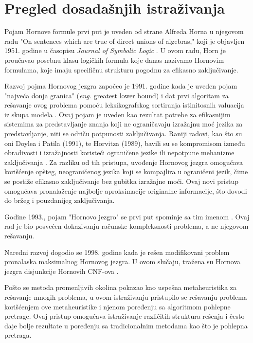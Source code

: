 \documentclass[12pt,oneside]{memoir}
\begin{document}
\section{Pregled dosadašnjih istraživanja}

Pojam Hornove formule prvi put je uveden od strane Alfreda Horna u njegovom radu "On sentences which are true of direct unions of algebras," koji je objavljen 1951. godine u časopisu \textit{Journal of Symbolic Logic} \cite{doc_horn_clause}. U ovom radu, Horn je proučavao posebnu klasu logičkih formula koje danas nazivamo Hornovim formulama, koje imaju specifičnu strukturu pogodnu za efikasno zaključivanje.

Razvoj pojma Hornovog jezgra započeo je 1991. godine kada je uveden pojam "najveća donja granica" (\textit{eng.} greatest lower bound) i dat prvi algoritam za rešavanje ovog problema pomoću leksikografskog sortiranja istinitosnih valuacija iz skupa modela \cite{doc2}. Ovaj pojam je uveden kao rezultat potrebe za efikasnijim sistemima za predstavljanje znanja koji ne ograničavaju izražajnu moć jezika za predstavljanje, niti se odriču potpunosti zaključivanja. Raniji radovi, kao što su oni Doylea i Patila (1991), te Horvitza (1989), bavili su se kompromisom između obradivosti i izražajnosti koristeći ograničene jezike ili nepotpune mehanizme zaključivanja \cite{doyle1991, horvitz1989}. Za razliku od tih pristupa, uvođenje Hornovog jezgra omogućava korišćenje opšteg, neograničenog jezika koji se kompajlira u ograničeni jezik, čime se postiže efikasno zaključivanje bez gubitka izražajne moći. Ovaj novi pristup omogućava pronalaženje najbolje aproksimacije originalne informacije, što dovodi do bržeg i pouzdanijeg zaključivanja.

Godine 1993., pojam "Hornovo jezgro" se prvi put spominje sa tim imenom \cite{doc3}. Ovaj rad je bio posvećen dokazivanju računske kompleksnosti problema, a ne njegovom rešavanju.

Naredni razvoj dogodio se 1998. godine kada je rešen modifikovani problem pronalaska maksimalnog Hornovog jezgra. U ovom slučaju, tražena su Hornova jezgra disjunkcije Hornovih CNF-ova \cite{doc1}.

Pošto se metoda promenljivih okolina pokazao kao uspešna metaheuristika za rešavanje mnogih problema, u ovom istraživanju pristupilo se rešavanju problema korišćenjem ove metaheuristike i njenom poređenju sa algoritmom pohlepne pretrage. Ovaj pristup omogućava istraživanje različitih struktura rešenja i često daje bolje rezultate u poređenju sa tradicionalnim metodama kao što je pohlepna pretraga.
\end{document}
